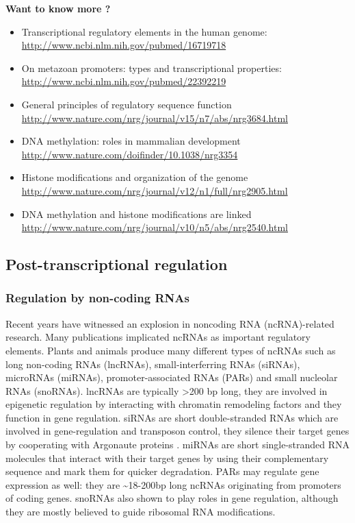 \documentclass[12pt,]{krantz}
\theoremstyle{definition}
\theoremstyle{definition}
\theoremstyle{definition}
\theoremstyle{remark}
\let\BeginKnitrBlock\begin \let\EndKnitrBlock\end
\begin{document}
\BeginKnitrBlock{rmdtip}
\textbf{Want to know more ?}

\begin{itemize}
\item
  Transcriptional regulatory elements in the human genome:
  \url{http://www.ncbi.nlm.nih.gov/pubmed/16719718}
\item
  On metazoan promoters: types and transcriptional properties:
  \url{http://www.ncbi.nlm.nih.gov/pubmed/22392219}
\item
  General principles of regulatory sequence function
  \url{http://www.nature.com/nrg/journal/v15/n7/abs/nrg3684.html}
\item
  DNA methylation: roles in mammalian development
  \url{http://www.nature.com/doifinder/10.1038/nrg3354}
\item
  Histone modifications and organization of the genome
  \url{http://www.nature.com/nrg/journal/v12/n1/full/nrg2905.html}
\item
  DNA methylation and histone modifications are linked
  \url{http://www.nature.com/nrg/journal/v10/n5/abs/nrg2540.html}
\end{itemize}
\EndKnitrBlock{rmdtip}

\hypertarget{post-transcriptional-regulation}{%
\subsection{Post-transcriptional
regulation}\label{post-transcriptional-regulation}}

\hypertarget{regulation-by-non-coding-rnas}{%
\subsubsection{Regulation by non-coding
RNAs}\label{regulation-by-non-coding-rnas}}

Recent years have witnessed an explosion in noncoding RNA
(ncRNA)-related research. Many publications implicated ncRNAs as
important regulatory elements. Plants and animals produce many different
types of ncRNAs such as long non-coding RNAs (lncRNAs),
small-interferring RNAs (siRNAs), microRNAs (miRNAs),
promoter-associated RNAs (PARs) and small nucleolar RNAs (snoRNAs).
lncRNAs are typically \textgreater{}200 bp long, they are involved in
epigenetic regulation by interacting with chromatin remodeling factors
and they function in gene regulation. siRNAs are short double-stranded
RNAs which are involved in gene-regulation and transposon control, they
silence their target genes by cooperating with Argonaute proteins .
miRNAs are short single-stranded RNA molecules that interact with their
target genes by using their complementary sequence and mark them for
quicker degradation. PARs may regulate gene expression as well: they are
\textasciitilde{}18-200bp long ncRNAs originating from promoters of
coding genes. snoRNAs also shown to play roles in gene regulation,
although they are mostly believed to guide ribosomal RNA modifications.
\end{document}
